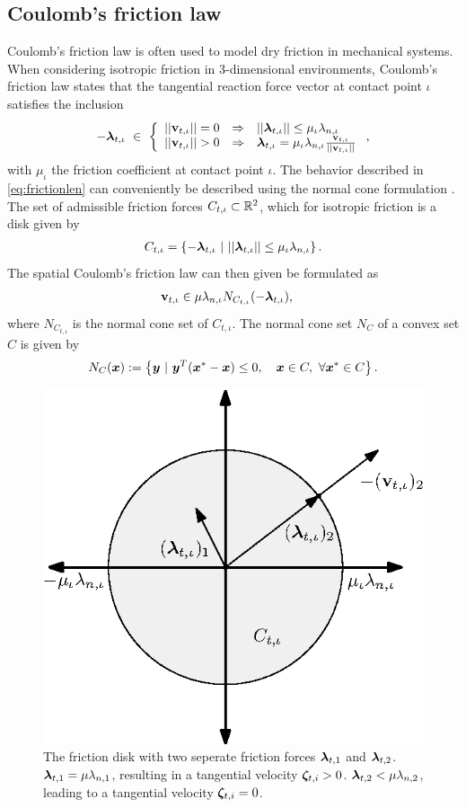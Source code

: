 \documentclass[../DC2017114Bouma.tex]{subfiles}
\begin{document}
\subsection{Coulomb's friction law}\label{sec:2fric}
Coulomb's friction law is often used to model dry friction in mechanical systems. When considering isotropic friction in 3-dimensional environments, Coulomb's friction law states that the tangential reaction force vector at contact point $\iota$ satisfies the inclusion
\begin{align}
-\lambdab_{t,\iota}\ \in\ \left\{ \begin{array}{lll}
||\vbf_{t,\iota}||=0 & \Rightarrow & ||\lambdab_{t,\iota}||\leq\mu_{\iota}\lambda_{n,\iota}\\
||\vbf_{t,\iota}||>0 & \Rightarrow & \lambdab_{t,\iota} = \mu_{\iota}\lambda_{n,\iota}\frac{\vbf_{t,\iota}}{||\vbf_{t,\iota}||}
\end{array}\right.,\label{eq:frictionlen}
\end{align}
%
with $\mu_{\iota}$ the friction coefficient at contact point $\iota$. The behavior described in \eqref{eq:frictionlen} can conveniently be described using the normal cone formulation \cite[Section 5.3.2]{Leine2008}. The set of admissible friction forces $C_{t,\iota}\subset\mathbb{R}^2$, which for isotropic friction is a disk given by
\begin{align}
C_{t,\iota} = \left\{-\boldsymbol{\lambda}_{t,\iota}\ |\ ||\boldsymbol{\lambda}_{t,\iota}|| \leq \mu_{\iota}\lambda_{n,\iota}\right\}.
\end{align}
The spatial Coulomb's friction law can then given be formulated as
\begin{align}
\mathbf{v}_{t,\iota} &\in \mu\lambda_{n,\iota}N_{C_{t,\iota}}(-\boldsymbol{\lambda}_{t,\iota}),\label{eq:2vNC}
\end{align}
where $N_{C_{t,\iota}}$ is the normal cone set of $C_{t,\iota}$. The normal cone set $N_{C}$ of a convex set $C$ is given by
\begin{align}
N_{C}(\xb) := \left\{\yb\ |\ \yb^T(\xb^\ast-\xb)\leq 0,\quad \xb\in C,\ \forall\xb^\ast\in C \right\}.
\end{align}

\begin{figure}[bt!]
\centering
\includegraphics[width=.4\textwidth]{2frictiondisk.eps}\caption{The friction disk with two seperate friction forces $\boldsymbol{\lambda}_{t,1}$ and $\boldsymbol{\lambda}_{t,2}$. $\boldsymbol{\lambda}_{t,1} = \mu\lambda_{n,1}$, resulting in a tangential velocity $\boldsymbol{\zeta}_{t,i}>0$. $\boldsymbol{\lambda}_{t,2}<\mu\lambda_{n,2}$, leading to a tangential velocity $\boldsymbol{\zeta}_{t,i}=0$.}\label{fig:2frictiondisk}
\end{figure}
\end{document}
